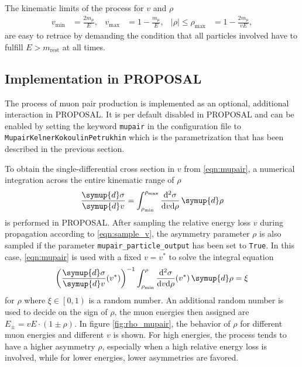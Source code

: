 The kinematic limits of the process for $v$ and $\rho$
%
\begin{align}
    v_\text{min} &= \frac{2 m_{\mu}}{E}, & v_\text{max} &= 1 - \frac{m_{\mu}}{E}, & \left| \rho \right| \leq \rho_{\text{max}} &= 1 - \frac{2 m_{\mu}}{v E},
\end{align}
%
are easy to retrace by demanding the condition that all particles involved have to fulfill $E > m_{\text{rest}}$ at all times.

\subsection{Implementation in PROPOSAL}
\label{sec:mupair_implementation}

\begin{sloppypar}
The process of muon pair production is implemented as an optional, additional interaction in PROPOSAL.
It is per default disabled in PROPOSAL and can be enabled by setting the keyword \texttt{mupair} in the configuration file to \texttt{MupairKelnerKokoulinPetrukhin} which is the parametrization that has been described in the previous section.
\end{sloppypar}

\begin{sloppypar}
To obtain the single-differential cross section in $v$ from \eqref{eqn:mupair}, a numerical integration across the entire kinematic range of $\rho$
%
\begin{equation}
    \frac{\symup{d}\sigma}{\symup{d}v} = \int_{\rho_{\text{min}}}^{\rho_{\text{max}}} \frac{\mathrm{d}^2\sigma}{\mathrm{d}v \mathrm{d}\rho} \, \symup{d}\rho
\end{equation}
%
is performed in PROPOSAL.
After sampling the relative energy loss $v$ during propagation according to \eqref{eqn:sample_v}, the asymmetry parameter $\rho$ is also sampled if the parameter \texttt{mupair\_particle\_output} has been set to \texttt{True}.
In this case, \eqref{eqn:mupair} is used with a fixed $v = v^{\ast}$ to solve the integral equation
\begin{equation}
    \left( \frac{\symup{d}\sigma}{\symup{d}v}(v^{\ast}) \right)^{-1} \int_{\rho_\text{min}}^{\rho} \frac{\mathrm{d}^2\sigma}{\mathrm{d}v \mathrm{d}\rho}(v^{\ast}) \, \symup{d}\rho = \xi
\end{equation}
for $\rho$ where $\xi \in \left[0,1\right)$ is a random number.
An additional random number is used to decide on the sign of $\rho$, the muon energies then assigned are $E_{\pm} = v E \cdot(1 \pm \rho)$.
In figure \ref{fig:rho_mupair}, the behavior of $\rho$ for different muon energies and different $v$ is shown.
For high energies, the process tends to have a higher asymmetry $\rho$, especially when a high relative energy loss is involved, while for lower energies, lower asymmetries are favored.
\end{sloppypar}


